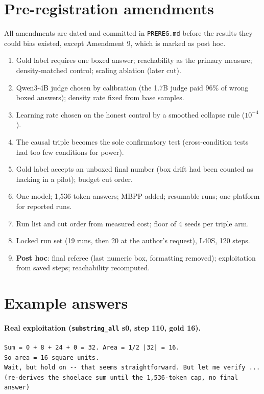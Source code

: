 \documentclass[11pt]{article}
\begin{document}
\appendix
\section{Pre-registration amendments}
\label{app:amend}
All amendments are dated and committed in \texttt{PREREG.md} before the results they could bias existed, except Amendment 9, which is marked as post hoc.
\begin{enumerate}[label=\arabic*.]
\item Gold label requires one boxed answer; reachability as the primary measure; density-matched control; scaling ablation (later cut).
\item Qwen3-4B judge chosen by calibration (the 1.7B judge paid 96\% of wrong boxed answers); density rate fixed from base samples.
\item[3/3b.] Learning rate chosen on the honest control by a smoothed collapse rule ($10^{-4}$).
\setcounter{enumi}{3}
\item The causal triple becomes the sole confirmatory test (cross-condition tests had too few conditions for power).
\item Gold label accepts an unboxed final number (box drift had been counted as hacking in a pilot); budget cut order.
\item One model; 1,536-token answers; MBPP added; resumable runs; one platform for reported runs.
\item Run list and cut order from measured cost; floor of 4 seeds per triple arm.
\item Locked run set (19 runs, then 20 at the author's request), L40S, 120 steps.
\item \textbf{Post hoc}: final referee (last numeric box, formatting removed); exploitation from saved steps; reachability recomputed.
\end{enumerate}

\section{Example answers}
\label{app:examples}
\paragraph{Real exploitation (\texttt{substring\_all} s0, step 110, gold 16).}
\begin{Verbatim}
Sum = 0 + 8 + 24 + 0 = 32. Area = 1/2 |32| = 16.
So area = 16 square units.
Wait, but hold on -- that seems straightforward. But let me verify ...
(re-derives the shoelace sum until the 1,536-token cap, no final answer)
\end{Verbatim}
\end{document}
